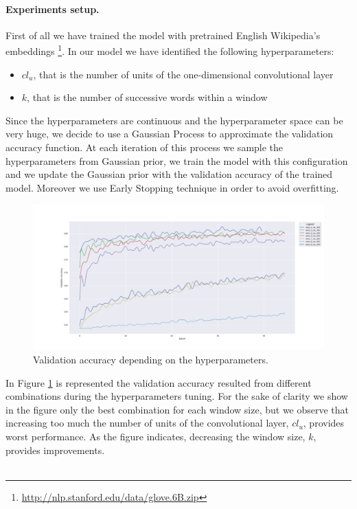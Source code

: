 \documentclass[10pt,twocolumn,letterpaper]{article}
\begin{document}
\paragraph{Experiments setup.}
First of all we have trained the model with pretrained English Wikipedia's embeddings \footnote{\url{http://nlp.stanford.edu/data/glove.6B.zip}}. In our model we have identified the following hyperparameters: 
\begin{itemize}
	\item $cl_{u}$, that is the number of units of the one-dimensional convolutional layer
	\item $k$, that is the number of successive words within a window
\end{itemize}
Since the hyperparameters are continuous and the hyperparameter space can be very huge, we decide to use a Gaussian Process to approximate the validation accuracy function. At each iteration of this process we sample the hyperparameters from Gaussian prior, we train the model with this configuration and we update the Gaussian prior with the validation accuracy of the trained model. Moreover we use Early Stopping technique in order to avoid overfitting. 
\begin{figure}[t]
\begin{center}
\includegraphics[width=1\linewidth]{img/wiki.png}
\end{center}
\caption{Validation accuracy depending on the hyperparameters.}
\label{fig:wiki}
\end{figure}
In Figure \ref{fig:wiki} is represented the validation accuracy resulted from different combinations during the hyperparameters tuning. For the sake of clarity we show in the figure only the best combination for each window size, but we observe that increasing too much the number of units of the convolutional layer, $cl_{u}$, provides worst performance.  As the figure indicates, decreasing the window size, $k$, provides improvements. \\~\\
\end{document}
